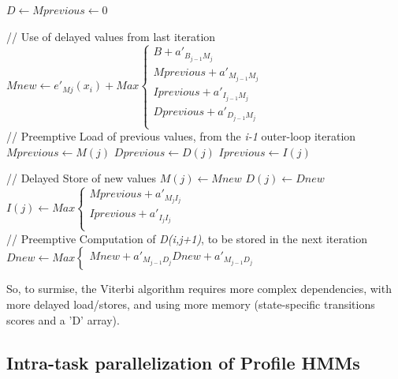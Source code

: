 \begin{enumerate}
\begin{enumerate}
\begin{algorithm}[htb!]
\begin{algorithmic}

	\State	 $ D \gets Mprevious \gets 0 $


		\State // Use of delayed values from last iteration
		\State $ Mnew \gets e'_{Mj}(x_i) + Max  
					\begin{cases}
						B     		+ a'_{B_{j-1} M_j} \\
						Mprevious	+ a'_{M_{j-1} M_j} \\
						Iprevious	+ a'_{I_{j-1} M_j} \\
						Dprevious	+ a'_{D_{j-1} M_j} \\
					\end{cases} $ \\
		
		\State // Preemptive Load of previous values, from the \emph{i-1} outer-loop iteration
		\State $ Mprevious \gets M(j) $
		\State $ Dprevious \gets D(j) $
		\State $ Iprevious \gets I(j) $
		
		\State // Delayed Store of new values
		\State $ M(j) \gets Mnew $
		\State $ D(j) \gets Dnew $
		\State $ I(j) \gets Max
						\begin{cases}
							Mprevious + a'_{M_{j} I_j} 	\\
							Iprevious + a'_{I_{j} I_j}	\\
						\end{cases} $	\\

		\State // Preemptive Computation of \emph{D(i,j+1)}, to be stored in the next iteration
		\State $Dnew \gets Max
						\begin{cases}
							Mnew + a'_{M_{j-1} D_j} 
							Dnew + a'_{M_{j-1} D_j} 
						\end{cases} $
	\EndFor
	
\EndFor

\end{algorithmic}
\end{algorithm}

\end{enumerate}
\end{enumerate}

So, to surmise, the Viterbi algorithm requires more complex dependencies, with more delayed load/stores, and using more memory (state-specific transitions scores and a 'D' array).



\subsection{Intra-task parallelization of Profile HMMs}

